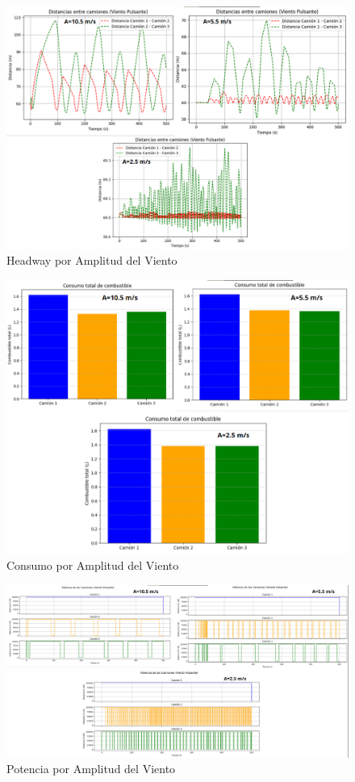 \documentclass[11pt,stdletter,orderfromtodate,sigleft,twoside]{report}
\begin{document}
\begin{enumerate}
\begin{figure}[H]
    \centering
    \includegraphics[width=0.75\linewidth]{figures//Cars/head pul ampl xd.png}
    \caption{Headway por Amplitud del Viento}
    \label{fig:enter-label}
\end{figure}

\begin{figure}[H]
    \centering
    \includegraphics[width=0.75\linewidth]{figures//Cars/comb pul amp xd.png}
    \caption{Consumo por Amplitud del Viento}
    \label{fig:enter-label}
\end{figure}

\begin{figure}[H]
    \centering
    \includegraphics[width=0.75\linewidth]{figures//Cars/pot mot puls ampl xd.png}
    \caption{Potencia por Amplitud del Viento}
    \label{fig:enter-label}
\end{figure}


\end{enumerate}
\end{document}

